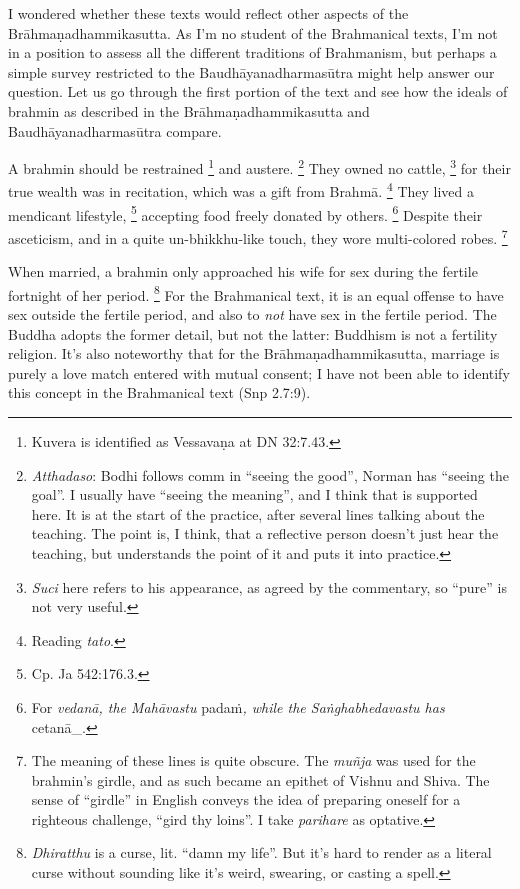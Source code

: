 \documentclass[12pt,openany]{book}%
\begin{document}
I wondered whether these texts would reflect other aspects of the \textsanskrit{Brāhmaṇadhammikasutta}. As I’m no student of the Brahmanical texts, I’m not in a position to assess all the different traditions of Brahmanism, but perhaps a simple survey restricted to the \textsanskrit{Baudhāyanadharmasūtra} might help answer our question. Let us go through the first portion of the text and see how the ideals of brahmin as described in the \textsanskrit{Brāhmaṇadhammikasutta} and \textsanskrit{Baudhāyanadharmasūtra} compare.

A brahmin should be restrained \footnote{Kuvera is identified as \textsanskrit{Vessavaṇa} at DN 32:7.43. } and austere. \footnote{\textit{Atthadaso}: Bodhi follows comm in “seeing the good”, Norman has “seeing the goal”. I usually have “seeing the meaning”, and I think that is supported here. It is at the start of the practice, after several lines talking about the teaching. The point is, I think, that a reflective person doesn't just hear the teaching, but understands the point of it and puts it into practice. } They owned no cattle, \footnote{\textit{Suci} here refers to his appearance, as agreed by the commentary, so “pure” is not very useful. } for their true wealth was in recitation, which was a gift from \textsanskrit{Brahmā}. \footnote{Reading \textit{tato}. } They lived a mendicant lifestyle, \footnote{Cp. Ja 542:176.3. } accepting food freely donated by others. \footnote{For \textit{\textsanskrit{vedanā}, the \textsanskrit{Mahāvastu} }\textsanskrit{padaṁ}\textit{, while the \textsanskrit{Saṅghabhedavastu} has }\textsanskrit{cetanā\_}. } Despite their asceticism, and in a quite un-bhikkhu-like touch, they wore multi-colored robes. \footnote{The meaning of these lines is quite obscure. The \textit{\textsanskrit{muñja}} was used for the brahmin’s girdle, and as such became an epithet of Vishnu and Shiva. The sense of “girdle” in English conveys the idea of preparing oneself for a righteous challenge, “gird thy loins”. I take \textit{parihare} as optative. }

When married, a brahmin only approached his wife for sex during the fertile fortnight of her period. \footnote{\textit{Dhiratthu} is a curse, lit. “damn my life”. But it's hard to render as a literal curse without sounding like it’s weird, swearing, or casting a spell. } For the Brahmanical text, it is an equal offense to have sex outside the fertile period, and also to \emph{not} have sex in the fertile period. The Buddha adopts the former detail, but not the latter: Buddhism is not a fertility religion. It’s also noteworthy that for the \textsanskrit{Brāhmaṇadhammikasutta}, marriage is purely a love match entered with mutual consent; I have not been able to identify this concept in the Brahmanical text (Snp 2.7:9).
\end{document}

